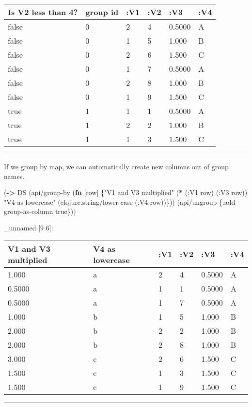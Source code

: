 \documentclass[]{article}
\newenvironment{Shaded}{\begin{snugshade}}{\end{snugshade}}
\newcommand{\KeywordTok}[1]{\textcolor[rgb]{0.13,0.29,0.53}{\textbf{#1}}}
\newcommand{\StringTok}[1]{\textcolor[rgb]{0.31,0.60,0.02}{#1}}
\newcommand{\VariableTok}[1]{\textcolor[rgb]{0.00,0.00,0.00}{#1}}
\newcommand{\AttributeTok}[1]{\textcolor[rgb]{0.77,0.63,0.00}{#1}}
\newcommand{\NormalTok}[1]{#1}
\begin{document}
\begin{longtable}[]{@{}llllll@{}}
\toprule
Is V2 less than 4? & group id & :V1 & :V2 & :V3 & :V4\tabularnewline
\midrule
\endhead
false & 0 & 2 & 4 & 0.5000 & A\tabularnewline
false & 0 & 1 & 5 & 1.000 & B\tabularnewline
false & 0 & 2 & 6 & 1.500 & C\tabularnewline
false & 0 & 1 & 7 & 0.5000 & A\tabularnewline
false & 0 & 2 & 8 & 1.000 & B\tabularnewline
false & 0 & 1 & 9 & 1.500 & C\tabularnewline
true & 1 & 1 & 1 & 0.5000 & A\tabularnewline
true & 1 & 2 & 2 & 1.000 & B\tabularnewline
true & 1 & 1 & 3 & 1.500 & C\tabularnewline
\bottomrule
\end{longtable}

\begin{center}\rule{0.5\linewidth}{0.5pt}\end{center}

If we group by map, we can automatically create new columns out of group
names.

\begin{Shaded}
\begin{Highlighting}[]
\NormalTok{(}\KeywordTok{->}\NormalTok{ DS}
\NormalTok{    (api/group-by (}\KeywordTok{fn}\NormalTok{ [row] \{}\StringTok{"V1 and V3 multiplied"}\NormalTok{ (}\KeywordTok{*}\NormalTok{ (}\AttributeTok{:V1}\NormalTok{ row)}
\NormalTok{                                                      (}\AttributeTok{:V3}\NormalTok{ row))}
                            \StringTok{"V4 as lowercase"}\NormalTok{ (clojure.string/lower-case (}\AttributeTok{:V4}\NormalTok{ row))\}))}
\NormalTok{    (api/ungroup \{}\AttributeTok{:add-group-as-column} \VariableTok{true}\NormalTok{\}))}
\end{Highlighting}
\end{Shaded}

\_unnamed {[}9 6{]}:

\begin{longtable}[]{@{}llllll@{}}
\toprule
V1 and V3 multiplied & V4 as lowercase & :V1 & :V2 & :V3 &
:V4\tabularnewline
\midrule
\endhead
1.000 & a & 2 & 4 & 0.5000 & A\tabularnewline
0.5000 & a & 1 & 1 & 0.5000 & A\tabularnewline
0.5000 & a & 1 & 7 & 0.5000 & A\tabularnewline
1.000 & b & 1 & 5 & 1.000 & B\tabularnewline
2.000 & b & 2 & 2 & 1.000 & B\tabularnewline
2.000 & b & 2 & 8 & 1.000 & B\tabularnewline
3.000 & c & 2 & 6 & 1.500 & C\tabularnewline
1.500 & c & 1 & 3 & 1.500 & C\tabularnewline
1.500 & c & 1 & 9 & 1.500 & C\tabularnewline
\bottomrule
\end{longtable}

\begin{center}\rule{0.5\linewidth}{0.5pt}\end{center}
\end{document}
